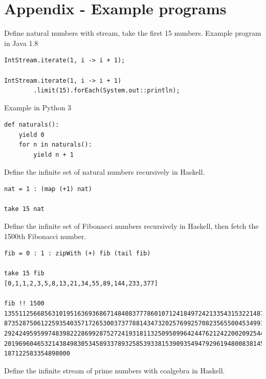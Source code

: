\documentclass{article}
\begin{document}
\begin{Exercise}
\end{Exercise}

\section{Appendix - Example programs}

Define natural numbers with stream, take the first 15 numbers. Example program in Java 1.8

\lstset{frame=single, language=Java}
\begin{lstlisting}
IntStream.iterate(1, i -> i + 1);

IntStream.iterate(1, i -> i + 1)
        .limit(15).forEach(System.out::println);
\end{lstlisting}

Example in Python 3

\lstset{frame=single, language=Python}
\begin{lstlisting}
def naturals():
    yield 0
    for n in naturals():
        yield n + 1
\end{lstlisting}

Define the infinite set of natural numbers recursively in Haskell.

\lstset{frame=single, language=Haskell}
\begin{lstlisting}
nat = 1 : (map (+1) nat)

take 15 nat
\end{lstlisting}

Define the infinite set of Fibonacci numbers recursively in Haskell, then fetch the 1500th Fibonacci number.

\lstset{frame=single, language=Haskell}
\begin{lstlisting}
fib = 0 : 1 : zipWith (+) fib (tail fib)

take 15 fib
[0,1,1,2,3,5,8,13,21,34,55,89,144,233,377]

fib !! 1500
13551125668563101951636936867148408377786010712418497242133543153221487310
87352875061225935403571726530037377881434732025769925708235655004534991410
29242495959974839822286992875272419318113250950996424476212422002092544399
20196960465321438498305345893378932585393381539093549479296194800838145996
187122583354898000
\end{lstlisting}

Define the infinite stream of prime numbers with coalgebra in Haskell.
\end{document}
